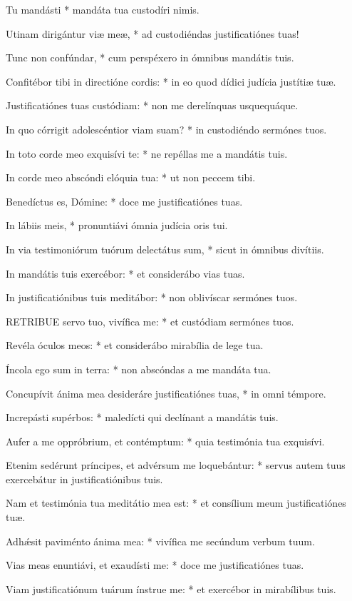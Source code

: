 Tu mandásti * mandáta tua custodíri nimis.

Utinam dirigántur viæ meæ, * ad custodiéndas justificatiónes tuas!

Tunc non confúndar, * cum perspéxero in ómnibus mandátis tuis.

Confitébor tibi in directióne cordis: * in eo quod dídici judícia justítiæ tuæ.

Justificatiónes tuas custódiam: * non me derelínquas usquequáque.

In quo córrigit adolescéntior viam suam? * in custodiéndo sermónes tuos.

In toto corde meo exquisívi te: * ne repéllas me a mandátis tuis.

In corde meo abscóndi elóquia tua: * ut non peccem tibi.

Benedíctus es, Dómine: * doce me justificatiónes tuas.

In lábiis meis, * pronuntiávi ómnia judícia oris tui.

In via testimoniórum tuórum delectátus sum, * sicut in ómnibus divítiis.

In mandátis tuis exercébor: * et considerábo vias tuas.

In justificatiónibus tuis meditábor: * non oblivíscar sermónes tuos.


\lettrine[lines=2]{R}{ETRIBUE} servo tuo, vivífica me: * et custódiam sermónes tuos.

Revéla óculos meos: * et considerábo mirabília de lege tua.

Íncola ego sum in terra: * non abscóndas a me mandáta tua.

Concupívit ánima mea desideráre justificatiónes tuas, * in omni témpore.

Increpásti supérbos: * maledícti qui declínant a mandátis tuis.

Aufer a me oppróbrium, et contémptum: * quia testimónia tua exquisívi.

Etenim sedérunt príncipes, et advérsum me loquebántur: * servus autem tuus exercebátur in justificatiónibus tuis.

Nam et testimónia tua meditátio mea est: * et consílium meum justificatiónes tuæ.

Adhǽsit paviménto ánima mea: * vivífica me secúndum verbum tuum.

Vias meas enuntiávi, et exaudísti me: * doce me justificatiónes tuas.

Viam justificatiónum tuárum ínstrue me: * et exercébor in mirabílibus tuis.

